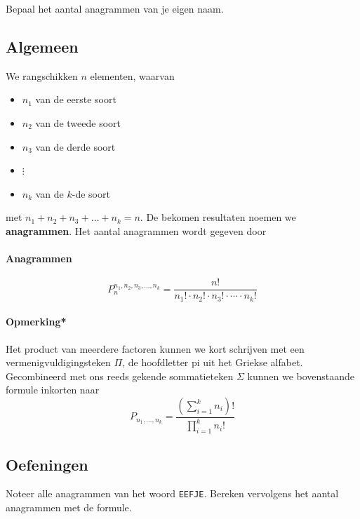 \documentclass[12pt,twoside]{article}
\begin{document}
\begin{oefening}
Bepaal het aantal anagrammen van je eigen naam.
\end{oefening}

\begin{theorie}

\subsection{Algemeen}

We rangschikken $n$ elementen, waarvan
\begin{itemize}
  \item $n_1$ van de eerste soort
  \item $n_2$ van de tweede soort
  \item $n_3$ van de derde soort
  \item $\vdots$
  \item $n_k$ van de $k$-de soort
\end{itemize}
met $n_1+n_2+n_3+\dots+n_k=n$. De bekomen resultaten noemen we {\bf anagrammen}. Het aantal anagrammen wordt gegeven door

\paragraph*{Anagrammen}
\begin{mdframed}
$$P^{n_1,n_2,n_3,\dots,n_k}_n = \dfrac{n!}{n_1!\cdot n_2!\cdot n_3!\cdot \cdots \cdot n_k!}$$
\end{mdframed}

\paragraph*{Opmerking*}
Het product van meerdere factoren kunnen we kort schrijven met een vermenigvuldigingsteken $\Pi$, de hoofdletter pi uit het Griekse alfabet. Gecombineerd met ons reeds gekende sommatieteken $\Sigma$ kunnen we bovenstaande formule inkorten naar
$$\displaystyle P_{n_1,\dots,n_k} = \dfrac{\left(\sum_{i=1}^k n_i\right)!}{\prod_{i=1}^k n_i!}$$

\subsection{Oefeningen}

\end{theorie}

\vspace*{-0.5cm}
\begin{oefening}
Noteer alle anagrammen van het woord \verb#EEFJE#. Bereken vervolgens het aantal anagrammen met de formule.
\end{oefening}
\end{document}
